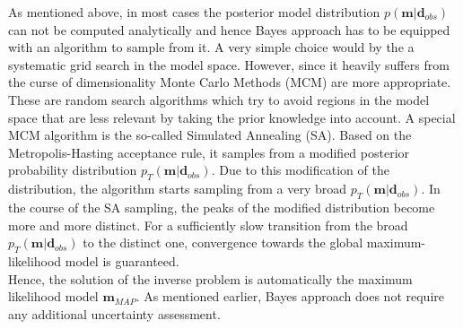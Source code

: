 As mentioned above, in most cases the posterior model distribution $p(\mathbf{m}|\mathbf{d}_{obs})$ can not be computed analytically and hence Bayes approach has to be equipped with an algorithm to sample from it.
A very simple choice would by the a systematic grid search in the model space.
However, since it heavily suffers from the curse of dimensionality Monte Carlo Methods (MCM) are more appropriate.
These are random search algorithms which try to avoid regions in the model space that are less relevant by taking the prior knowledge into account.
A special MCM algorithm is the so-called Simulated Annealing (SA).
Based on the Metropolis-Hasting acceptance rule, it samples from a modified posterior probability distribution $p_T(\mathbf{m}|\mathbf{d}_{obs})$.
Due to this modification of the distribution, the algorithm starts sampling from a very broad $p_T(\mathbf{m}|\mathbf{d}_{obs})$.
In the course of the SA sampling, the peaks of the modified distribution become more and more distinct.
For a sufficiently slow transition from the broad $p_T(\mathbf{m}|\mathbf{d}_{obs})$ to the distinct one, convergence towards the global maximum-likelihood model is guaranteed.\\
Hence, the solution of the inverse problem is automatically the maximum likelihood model $\mathbf{m}_{MAP}$.
As mentioned earlier, Bayes approach does not require any additional uncertainty assessment.